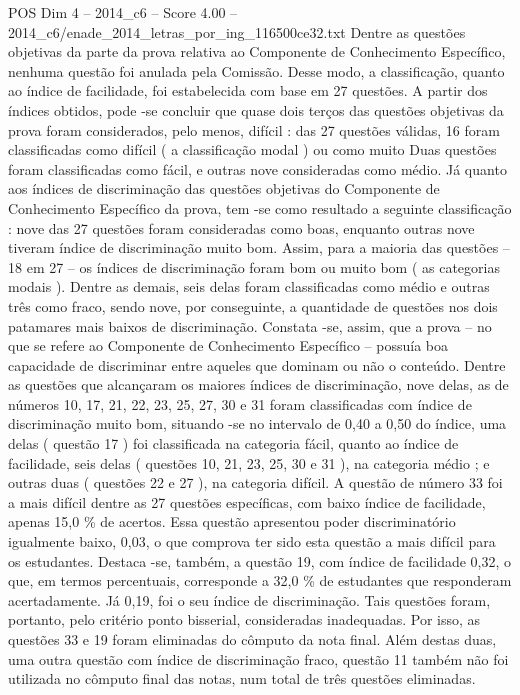 \begin{textsample}{POS Dim 4 – 2014\_c6 – Score 4.00 – 2014\_c6/enade\_2014\_letras\_por\_ing\_116500ce32.txt}
Dentre as questões objetivas da parte da prova relativa ao Componente de Conhecimento Específico, nenhuma questão foi anulada pela Comissão.
Desse modo, a classificação, quanto ao índice de facilidade, foi estabelecida com base em 27 questões.
A partir dos índices obtidos, pode -se concluir que quase dois terços das questões objetivas da prova foram considerados, pelo menos, difícil : das 27 questões válidas, 16 foram classificadas como difícil ( a classificação modal ) ou como muito Duas questões foram classificadas como fácil, e outras nove consideradas como médio.
Já quanto aos índices de discriminação das questões objetivas do Componente de Conhecimento Específico da prova, tem -se como resultado a seguinte classificação : nove das 27 questões foram consideradas como boas, enquanto outras nove tiveram índice de discriminação muito bom.
Assim, para a maioria das questões – 18 em 27 – os índices de discriminação foram bom ou muito bom ( as categorias modais ).
Dentre as demais, seis delas foram classificadas como médio e outras três como fraco, sendo nove, por conseguinte, a quantidade de questões nos dois patamares mais baixos de discriminação.
Constata -se, assim, que a prova – no que se refere ao Componente de Conhecimento Específico – possuía boa capacidade de discriminar entre aqueles que dominam ou não o conteúdo.
Dentre as questões que alcançaram os maiores índices de discriminação, nove delas, as de números 10, 17, 21, 22, 23, 25, 27, 30 e 31 foram classificadas com índice de discriminação muito bom, situando -se no intervalo de 0,40 a 0,50 do índice, uma delas ( questão 17 ) foi classificada na categoria fácil, quanto ao índice de facilidade, seis delas ( questões 10, 21, 23, 25, 30 e 31 ), na categoria médio ; e outras duas ( questões 22 e 27 ), na categoria difícil.
A questão de número 33 foi a mais difícil dentre as 27 questões específicas, com baixo índice de facilidade, apenas 15,0 \% de acertos.
Essa questão apresentou poder discriminatório igualmente baixo, 0,03, o que comprova ter sido esta questão a mais difícil para os estudantes.
Destaca -se, também, a questão 19, com índice de facilidade 0,32, o que, em termos percentuais, corresponde a 32,0 \% de estudantes que responderam acertadamente.
Já 0,19, foi o seu índice de discriminação.
Tais questões foram, portanto, pelo critério ponto bisserial, consideradas inadequadas.
Por isso, as questões 33 e 19 foram eliminadas do cômputo da nota final.
Além destas duas, uma outra questão com índice de discriminação fraco, questão 11 também não foi utilizada no cômputo final das notas, num total de três questões eliminadas.

\end{textsample}
